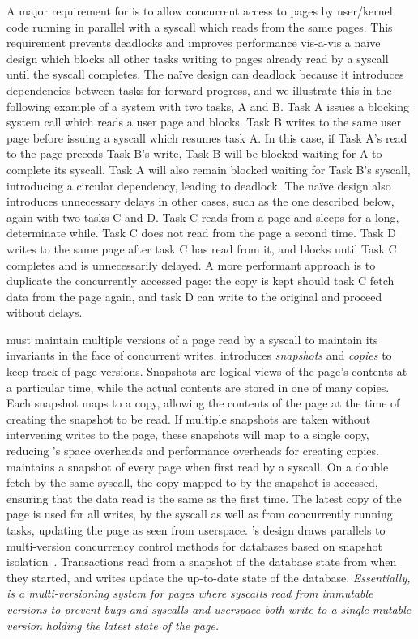 \documentclass[letterpaper,twocolumn,10pt, anonymous]{article}
\begin{document}
A major requirement for \tiktok is to allow concurrent access to pages
by user/kernel code running in parallel with a syscall which reads from 
the same pages.
This requirement prevents deadlocks and improves performance vis-a-vis
a na\"ive design which blocks all other tasks writing to pages already 
read by a syscall until the syscall completes.
The na\"ive design can deadlock because it introduces dependencies between
tasks for forward progress, and we illustrate this in the following example
of a system with two tasks, A and B. 
Task A issues a blocking system call which reads a user page and blocks. 
Task B writes to the same user page before issuing a syscall which 
resumes task A. 
In this case, if Task A's read to the page preceds Task B's write, 
Task B will be blocked waiting for A to complete its syscall.
Task A will also remain blocked waiting for Task B's syscall, 
introducing a circular dependency, leading to deadlock.
The na\"ive design also introduces unnecessary delays in other cases, 
such as the one described below, again with two tasks C and D.
Task C reads from a page and sleeps for a long, determinate while.
Task C does not read from the page a second time.
Task D writes to the same page after task C has read from it, and 
blocks until Task C completes and is unnecessarily delayed.
A more performant approach is to duplicate the concurrently accessed page: the copy is 
kept should task C fetch data from the page again, and task D
can write to the original and proceed without delays.

\tiktok must maintain multiple versions of a page read by a syscall 
to maintain its invariants in the face of concurrent writes.
\tiktok introduces \emph{snapshots} and \emph{copies} to keep track 
of page versions. 
Snapshots are logical views of the page's contents at a particular time,
while the actual contents are stored in one of many copies. 
Each snapshot maps to a copy, allowing the contents of the page at the 
time of creating the snapshot to be read. 
If multiple snapshots are taken without intervening writes to the page, 
these snapshots will map to a single copy, reducing \tiktok's space overheads 
and performance overheads for creating copies.
\tiktok maintains a snapshot of every page when first read by a syscall.
On a double fetch by the same syscall, the copy mapped to by the snapshot 
is accessed, ensuring that the data read is the same as the first time.
The latest copy of the page is used for all writes, by the syscall as 
well as from concurrently running tasks, updating the page as seen 
from userspace.
%
\tiktok's design draws parallels to multi-version concurrency control 
methods for databases based on snapshot isolation~\cite{0001MK15}.
Transactions read from a snapshot of the database state from when 
they started, and writes update the up-to-date state of the database.
%
\emph{Essentially, \tiktok is a multi-versioning system for pages where 
syscalls read from immutable versions to prevent \tocttou bugs and
syscalls and userspace both write to a single mutable version 
holding the latest state of the page.}
\end{document}
